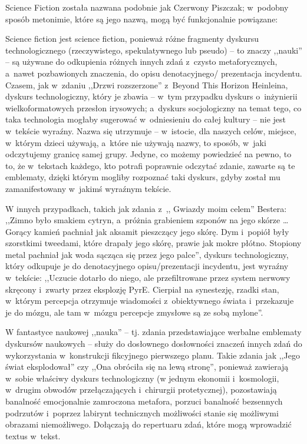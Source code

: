 \documentclass[oneside,polish,11pt,rmheadings]{mwbk}
\begin{document}
Science Fiction została nazwana podobnie jak Czerwony Piszczak; w~podobny sposób metonimie, które są jego nazwą, mogą być funkcjonalnie powiązane: 

Science fiction jest science fiction, ponieważ różne fragmenty dyskursu technologicznego (rzeczywistego, spekulatywnego lub pseudo) -- to znaczy ,,nauki'' -- są używane do odkupienia różnych innych zdań z~czysto metaforycznych, a~nawet pozbawionych znaczenia, do opisu denotacyjnego/ prezentacja incydentu. Czasem, jak w~zdaniu ,,Drzwi rozszerzone'' z~Beyond This Horizon Heinleina, dyskurs technologiczny, który je zbawia -- w~tym przypadku dyskurs o~inżynierii wielkoformatowych przesłon irysowych; a~dyskurs socjologiczny na temat tego, co taka technologia mogłaby sugerować w~odniesieniu do całej kultury -- nie jest w~tekście wyraźny. Nazwa się utrzymuje -- w~istocie, dla naszych celów, miejsce, w~którym dzieci używają, a~które nie używają nazwy, to sposób, w~jaki odczytujemy granicę samej grupy. Jedyne, co możemy powiedzieć na pewno, to to, że w~tekstach każdego, kto potrafi poprawnie odczytać zdanie, zawarte są te emblematy, dzięki którym mogliby rozpoznać taki dyskurs, gdyby został mu zamanifestowany w~jakimś wyraźnym tekście. 

W innych przypadkach, takich jak zdania z~,, Gwiazdy moim celem'' Bestera: ,,Zimno było smakiem cytryn, a~próżnia grabieniem szponów na jego skórze \ldots  Gorący kamień pachniał jak aksamit pieszczący jego skórę. Dym i~popiół były szorstkimi tweedami, które drapały jego skórę, prawie jak mokre płótno. Stopiony metal pachniał jak woda sącząca się przez jego palce'', dyskurs technologiczny, który odkupuje je do denotacyjnego opisu/prezentacji incydentu, jest wyraźny w~tekście: ,,Uczucie dotarło do niego, ale przefiltrowane przez system nerwowy skręcony i~zwarty przez eksplozję PyrE. Cierpiał na synestezję, rzadki stan, w~którym percepcja otrzymuje wiadomości z~obiektywnego świata i~przekazuje je do mózgu, ale tam w~mózgu percepcje zmysłowe są ze sobą mylone''. 

W fantastyce naukowej ,,nauka'' -- tj. zdania przedstawiające werbalne emblematy dyskursów naukowych -- służy do dosłownego dosłowności znaczeń innych zdań do wykorzystania w~konstrukcji fikcyjnego pierwszego planu. Takie zdania jak ,,Jego świat eksplodował'' czy ,,Ona obróciła się na lewą stronę'', ponieważ zawierają w~sobie właściwy dyskurs technologiczny (w jednym ekonomii i~kosmologii, w~drugim obwodów przełączających i~chirurgii protetycznej), pozostawiają banalność emocjonalnie zamroczona metafora, porzuci banalność bezsennych podrzutów i~poprzez labirynt technicznych możliwości stanie się możliwymi obrazami niemożliwego. Dołączają do repertuaru zdań, które mogą wprowadzić textus w~tekst. 
\end{document}
